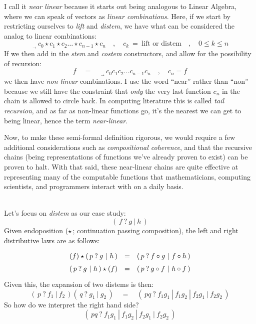 \documentclass[twoside]{article}
\newcommand{\qeq}{\ensuremath{\quad =\quad}}
\newcommand{\strong}[1]{{\bfseries #1}}
\newcommand{\readright}{\ensuremath{\,_{_\rightarrow}\,}}
\newcommand{\lift}{\mbox{lift}}
\newcommand{\distem}{\mbox{distem}}
\begin{document}
\begin{minipage}{12cm}
I call it \emph{near linear} because it starts out being analogous to Linear Algebra, where we
can speak of vectors as \emph{linear combinations}. Here, if we start by restricting ourselves to
\emph{lift} and \emph{distem}, we have what can be considered the analog to linear combinations:\\[-1ex]
$$ \readright c_0 \star c_1 \star c_2 \ldots \star c_{n-1}\star c_n
	\quad,\quad c_k\ =\ \lift\mbox{ or }\distem
	\quad,\quad 0\le k\le n $$
If we then add in the \emph{stem} and \emph{costem} constructors, and allow for the possibility of recursion:\\[-1ex]
$$ f \qeq \readright c_0c_1c_2\ldots c_{n-1}c_n \quad,\quad c_n = f $$
we then have \emph{non-linear} combinations. I use the word ``near'' rather than ``non'' because we still have
the constraint that \emph{only} the very last function $ c_n $ in the chain is allowed to circle back. In computing
literature this is called \emph{tail recursion}, and as far as non-linear functions go, it's the nearest we
can get to being linear, hence the term \emph{near-linear}.

Now, to make these semi-formal definition rigorous, we would require a few additional considerations such as
\emph{compositional coherence}, and that the recursive chains (being representations of functions we've already proven
to exist) can be proven to halt. With that said, these near-linear chains are quite effective at representing many of
the computable functions that mathematicians, computing scientists, and programmers interact with on a daily basis.


\end{minipage}\newpage\begin{minipage}{12cm}


\noindent\strong{Stem operator distributive laws:}\\[1ex]

Let's focus on \emph{distem} as our case study:
$$ (\,f\:?\:g\ |\ h\,) $$
Given endoposition ($\star$\,; continuation passing composition),
the left and right distributive laws are as follows:
$$ \def\arraystretch{1.5}
\begin{array}{rclcl}
(f)\star(\,p\:?\:g\ |\ h\,)	& = & (\,p\:?\:f\circ g\ |\ f\circ h\,)		\\
(\,p\:?\:g\ |\ h\,)\star(f)	& = & (\,p\:?\:g\circ f\ |\ h\circ f\,)
\end{array} $$
Given this, the expansion of two distems is then:
$$ (\,p\:?\:f_1\ |\ f_2\,)(\,q\:?\:g_1\ |\ g_2\,) \qeq (\,pq\:?\:f_1g_1\ |\ f_1g_2\ |\ f_2g_1\ |\ f_2g_2\,) $$
So how do we interpret the right hand side?
$$ (\,pq\:?\:f_1g_1\ |\ f_1g_2\ |\ f_2g_1\ |\ f_2g_2\,) $$



\end{minipage}
\end{document}
